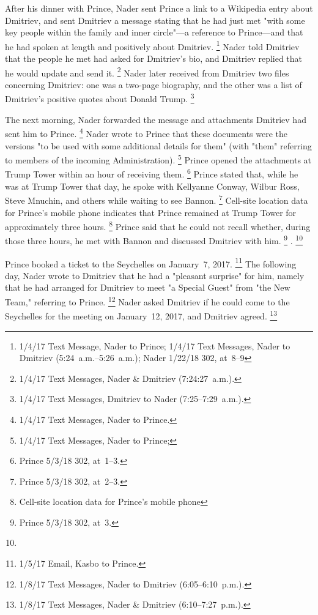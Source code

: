 After his dinner with Prince, Nader sent Prince a link to a Wikipedia entry about Dmitriev, and sent Dmitriev a message stating that he had just met "with some key people within the family and inner circle"---a reference to Prince---and that he had spoken at length and positively about Dmitriev.%
\footnote{1/4/17 Text Message, Nader to Prince;
1/4/17 Text Messages, Nader to Dmitriev (5:24~a.m.--5:26~a.m.);
Nader 1/22/18 302, at~8--9
}
Nader told Dmitriev that the people he met had asked for Dmitriev's bio, and Dmitriev replied that he would update and send it.%
\footnote{1/4/17 Text Messages, Nader \& Dmitriev (7:24:27~a.m.).}
Nader later received from Dmitriev two files concerning Dmitriev: one was a two-page biography, and the other was a list of Dmitriev's positive quotes about Donald Trump.%
\footnote{1/4/17 Text Messages, Dmitriev to Nader (7:25--7:29~a.m.).}

The next morning, Nader forwarded the message and attachments Dmitriev had sent him to Prince.%
\footnote{1/4/17 Text Messages, Nader to Prince.}
Nader wrote to Prince that these documents were the versions "to be used with some additional details for them" (with "them" referring to members of the incoming Administration).%
\footnote{1/4/17 Text Messages, Nader to Prince; }
Prince opened the attachments at Trump Tower within an hour of receiving them.%
\footnote{Prince 5/3/18 302, at~1--3.}
Prince stated that, while he was at Trump Tower that day, he spoke with Kellyanne Conway, Wilbur Ross, Steve Mnuchin, and others while waiting to see Bannon.%
\footnote{Prince 5/3/18 302, at~2--3.}
Cell-site location data for Prince's mobile phone indicates that Prince remained at Trump Tower for approximately three hours.%
\footnote{Cell-site location data for Prince's mobile phone }
Prince said that he could not recall whether, during those three hours, he met with Bannon and discussed Dmitriev with him.%
\footnote{Prince 5/3/18 302, at~3.}
.%
\footnote{}

Prince booked a ticket to the Seychelles on January~7, 2017.%
\footnote{1/5/17 Email, Kasbo to Prince.}
The following day, Nader wrote to Dmitriev that he had a "pleasant surprise" for him, namely that he had arranged for Dmitriev to meet "a Special Guest" from "the New Team," referring to Prince.%
\footnote{1/8/17 Text Messages, Nader to Dmitriev (6:05--6:10~p.m.).}
Nader asked Dmitriev if he could come to the Seychelles for the meeting on January~12, 2017, and Dmitriev agreed.%
\footnote{1/8/17 Text Messages, Nader \& Dmitriev (6:10--7:27~p.m.).}

